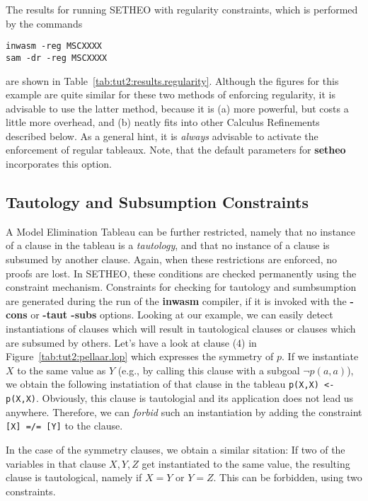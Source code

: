 The results for running SETHEO with regularity constraints, which
is performed by the commands
\begin{center}
\begin{verbatim}
inwasm -reg MSCXXXX
sam -dr -reg MSCXXXX
\end{verbatim}
\end{center}
are shown in Table~\ref{tab:tut2:results.regularity}.
Although the figures for this example are quite similar for these
two methods of enforcing regularity, it is advisable to use the
latter method, because it is (a) more powerful, but costs a little
more overhead, and (b) neatly fits into other Calculus Refinements
described below. As a general hint, it is {\em always\/} advisable to
activate the enforcement of regular tableaux. Note, that the
default parameters for {\bf setheo} incorporates this option.

\subsection{Tautology and Subsumption Constraints}

A Model Elimination Tableau can be further restricted, namely that
no instance of a clause in the tableau is a {\em tautology\/}, and
that no instance of a clause is subsumed by another clause.
Again, when these restrictions are enforced, no proofs are lost.
In SETHEO, these conditions are checked permanently using
the constraint mechanism. Constraints for checking for tautology and
sumbsumption are generated during the run of the {\bf inwasm} compiler,
if it is invoked with the {\bf -cons} or {\bf -taut -subs} options.
Looking at our example, we can easily detect instantiations of clauses
which will result in tautological clauses or clauses which are subsumed
by others. Let's have a look at clause (4) in 
Figure~\ref{tab:tut2:pellaar.lop} which expresses the symmetry of $p$.
If we instantiate $X$ to the same value as $Y$ (e.g., by calling this
clause with a subgoal $\neg p(a,a)$), we obtain the following
instatiation of that clause in the tableau
{\tt p(X,X) <- p(X,X)}. Obviously, this clause is tautologial and
its application does not lead us anywhere. Therefore, we can {\em forbid\/}
such an instantiation by adding the constraint {\tt [X] =/= [Y]}
to the clause.

In the case of the symmetry clauses, we obtain a similar sitation:
If two of the variables in that clause $X,Y,Z$ get instantiated to the
same value, the resulting clause is tautological, namely if
$X = Y$ or $Y = Z$. This can be forbidden, using two constraints.

